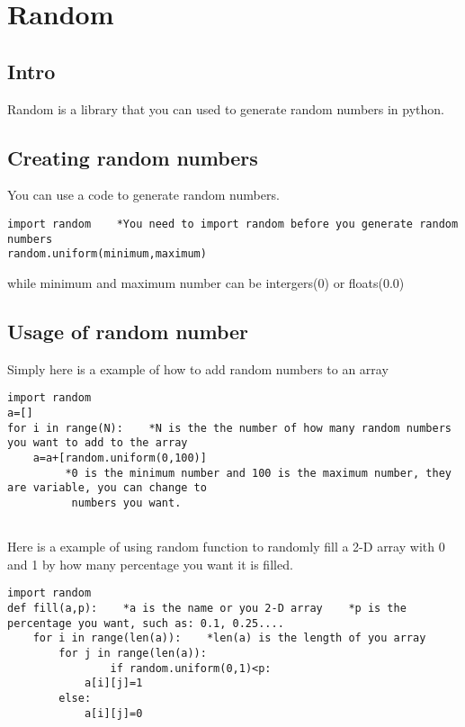 \chapter{Random}
\section{Intro}
Random is a library that you can used to generate random numbers in python.
\section{Creating random numbers}
You can use a code to generate random numbers.
\begin{verbatim}
import random    *You need to import random before you generate random numbers
random.uniform(minimum,maximum)
\end{verbatim}
while minimum and maximum number can be intergers(0) or floats(0.0)

\section{Usage of random number}
Simply here is a example of how to add random numbers to an array
\begin{verbatim}
import random
a=[]
for i in range(N):    *N is the the number of how many random numbers you want to add to the array
    a=a+[random.uniform(0,100)]   
         *0 is the minimum number and 100 is the maximum number, they are variable, you can change to 
          numbers you want.
    
\end{verbatim}
Here is a example of using random function to randomly fill a 2-D array with 0 and 1 by how many percentage you want it is filled.

\begin{verbatim}
import random
def fill(a,p):    *a is the name or you 2-D array    *p is the percentage you want, such as: 0.1, 0.25....
    for i in range(len(a)):    *len(a) is the length of you array
        for j in range(len(a)):
        	    if random.uniform(0,1)<p:
	        a[i][j]=1
	    else:
	        a[i][j]=0
\end{verbatim}
